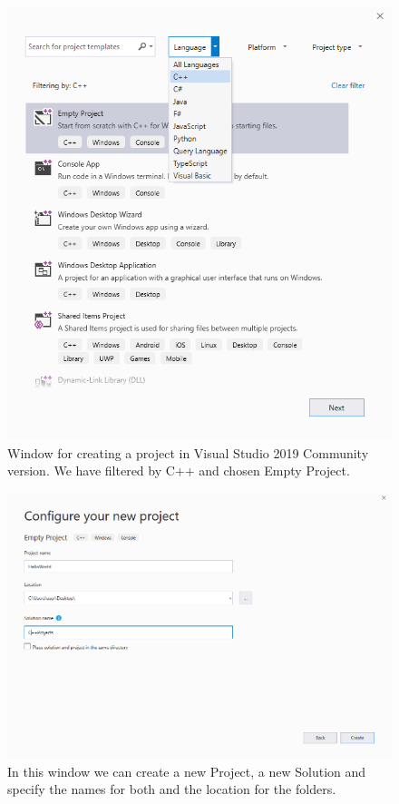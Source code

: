 \begin{figure}
    \centering
    \includegraphics[width= \textwidth]{Figures/C++1}
    \caption{Window for creating a project in Visual Studio 2019 Community version. We have filtered by C++ and chosen Empty Project.}
    \label{fig:C++1}
\end{figure}

\begin{figure}
    \centering
    \includegraphics[width= \textwidth]{Figures/C++2}
    \caption{In this window we can create a new Project, a new Solution and specify the names for both and the location for the folders.}
    \label{fig:C++2}
\end{figure}

